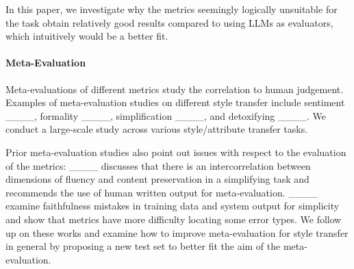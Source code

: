 In this paper, we investigate why the metrics seemingly logically unsuitable for the task obtain relatively good results compared to using LLMs as evaluators, which intuitively would be a better fit.

\paragraph{Meta-Evaluation}
Meta-evaluations of different metrics study the correlation to human judgement. Examples of meta-evaluation studies on different style transfer include sentiment ____, formality ____, simplification  ____, and detoxifying ____. We conduct a large-scale study across various style/attribute transfer tasks.

Prior meta-evaluation studies also point out issues with respect to the evaluation of the metrics: ____ discusses that there is an intercorrelation between dimensions of fluency and content preservation in a simplifying task and recommends the use of human written output for meta-evaluation. ____ examine faithfulness mistakes in training data and system output for simplicity and show that metrics have more difficulty locating some error types. We follow up on these works and examine how to improve meta-evaluation for style transfer in general by proposing a new test set to better fit the aim of the meta-evaluation.
